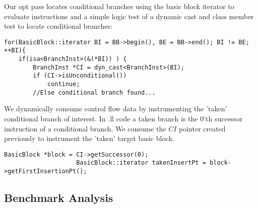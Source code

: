 Our opt pass locates conditional branches using the basic block iterator to evaluate instructions and a simple logic test of a dynamic cast and class member test to locate conditional branches:\\

\begin{frame}[fragile]
\begin{lstlisting}
for(BasicBlock::iterator BI = BB->begin(), BE = BB->end(); BI != BE; ++BI){
	if(isa<BranchInst>(&(*BI)) ) {
    	BranchInst *CI = dyn_cast<BranchInst>(BI);
        if (CI->isUnconditional())
        	continue; 
		//Else conditional branch found...
\end{lstlisting}
\end{frame}

We dynamically consume control flow data by instrumenting the 'taken' conditional branch of interest. In .ll code a taken branch is the 0'th successor instruction of a conditional branch. We consume the $CI$ pointer created previously to instrument the 'taken' target basic block.\\

\begin{frame}[fragile]
\begin{lstlisting}
BasicBlock *block = CI->getSuccessor(0);
                    BasicBlock::iterator takenInsertPt = block->getFirstInsertionPt();
\end{lstlisting}
\end{frame}
  

\subsection{Benchmark Analysis}
